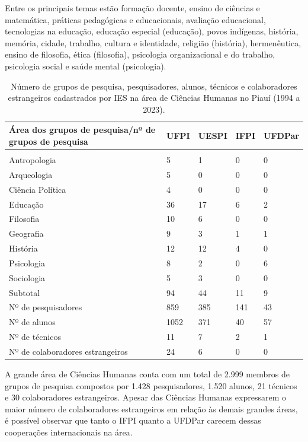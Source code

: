 \documentclass[portuguese]{textolivre}
\begin{document}
Entre os principais temas estão formação docente, ensino de ciências e matemática, práticas pedagógicas e educacionais, avaliação educacional, tecnologias na educação, educação especial (educação), povos indígenas, história, memória, cidade, trabalho, cultura e identidade, religião (história), hermenêutica, ensino de filosofia, ética (filosofia), psicologia organizacional e do trabalho, psicologia social e saúde mental (psicologia).

\begin{table}[htbp]
\centering
\begin{threeparttable}
\caption{Número de grupos de pesquisa, pesquisadores, alunos, técnicos e colaboradores estrangeiros cadastrados por IES na área de Ciências Humanas no Piauí (1994 a 2023).}
\label{tbl8}
\begin{tabular}{>{\raggedright\arraybackslash}p{5cm} l l l l}
\toprule
Área dos grupos de pesquisa/nº de grupos de pesquisa & UFPI & UESPI & IFPI & UFDPar \\ 
\midrule
\multicolumn{5}{c}{Ciências Humanas} \\
\midrule
Antropologia & 5 & 1 & 0 & 0 \\
Arqueologia & 5 & 0 & 0 & 0 \\
Ciência Política & 4 & 0 & 0 & 0 \\
Educação & 36 & 17 & 6 & 2 \\
Filosofia & 10 & 6 & 0 & 0 \\
Geografia & 9 & 3 & 1 & 1 \\
História & 12 & 12 & 4 & 0 \\
Psicologia & 8 & 2 & 0 & 6 \\
Sociologia & 5 & 3 & 0 & 0 \\
Subtotal & 94 & 44 & 11 & 9 \\
\midrule
Nº de pesquisadores & 859 & 385 & 141 & 43 \\
Nº de alunos & 1052 & 371 & 40 & 57 \\
Nº de técnicos & 11 & 7 & 2 & 1 \\
Nº de colaboradores estrangeiros & 24 & 6 & 0 & 0 \\
\bottomrule
\end{tabular}
\end{threeparttable}
\end{table}

A grande área de Ciências Humanas conta com um total de 2.999 membros de grupos de pesquisa compostos por 1.428 pesquisadores, 1.520 alunos, 21 técnicos e 30 colaboradores estrangeiros. Apesar das Ciências Humanas expressarem o maior número de colaboradores estrangeiros em relação às demais grandes áreas, é possível observar que tanto o IFPI quanto a UFDPar carecem dessas cooperações internacionais na área.
\end{document}
